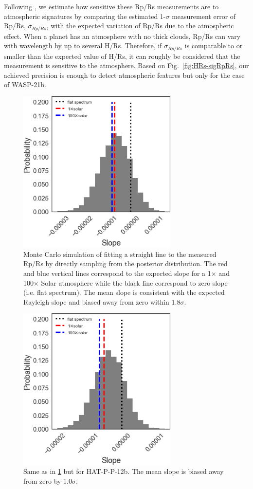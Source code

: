 Following \cite{Fukui2016a}, we estimate how sensitive these Rp/Rs measurements are to atmospheric signatures by comparing the estimated 1-$\sigma$ measurement error of Rp/Rs, $\sigma_{Rp/Rs}$, with the expected variation
of Rp/Rs due to the atmospheric effect. When a planet has an atmosphere with no thick clouds, Rp/Rs can vary with wavelength by up to several H/Rs. Therefore, if $\sigma_{Rp/Rs}$ is comparable to or smaller than the expected value of H/Rs, it can roughly be considered that the measurement is sensitive to the atmosphere. Based on Fig.~\ref{fig:HRs-sigRpRs}, our achieved precision is enough to detect atmospheric features but only for the case of WASP-21b.

\begin{figure}
\centering
	\includegraphics[width=8cm]{hatp12/slope.png}
    \caption{Monte Carlo simulation of fitting a straight line to the measured Rp/Rs by directly sampling from the posterior distribution. The red and blue vertical lines correspond to the expected slope for a 1$\times$ and 100$\times$ Solar atmosphere while the black line correspond to zero slope (i.e. flat spectrum). The mean slope is consistent with the expected Rayleigh slope and biased away from zero within 1.8$\sigma$.
    }\label{fig:hatp12_slope}
\end{figure}

\begin{figure}
\centering
	\includegraphics[width=8cm]{hatp44/slope.png}
    \caption{Same as in \ref{fig:hatp12_slope} but for HAT-P-P-12b. The mean slope is biased away from zero by 1.0$\sigma$.
    }\label{fig:hatp44_slope}
\end{figure}

